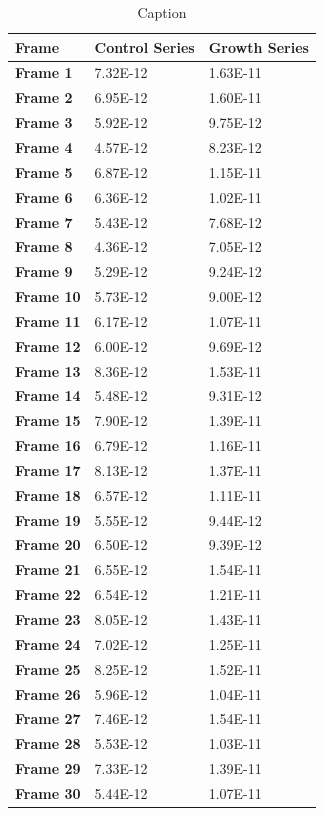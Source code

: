 \documentclass{article}
\begin{document}
\begin{table}[h!]
    \centering
    \begin{tabular}{ |p{3cm}||p{3cm}|p{3cm}|  }
     \hline Frame & Control Series & Growth Series\\
 \hline 
\textbf{Frame 1} & 7.32E-12 & 1.63E-11\\
\textbf{Frame 2} & 6.95E-12 & 1.60E-11\\
\textbf{Frame 3} & 5.92E-12 & 9.75E-12\\
\textbf{Frame 4} & 4.57E-12 & 8.23E-12\\
\textbf{Frame 5} & 6.87E-12 & 1.15E-11\\
\textbf{Frame 6} & 6.36E-12 & 1.02E-11\\
\textbf{Frame 7} & 5.43E-12 & 7.68E-12\\
\textbf{Frame 8} & 4.36E-12 & 7.05E-12\\
\textbf{Frame 9} & 5.29E-12 & 9.24E-12\\
\textbf{Frame 10} & 5.73E-12 & 9.00E-12\\
\textbf{Frame 11} & 6.17E-12 & 1.07E-11\\
\textbf{Frame 12} & 6.00E-12 & 9.69E-12\\
\textbf{Frame 13} & 8.36E-12 & 1.53E-11\\
\textbf{Frame 14} & 5.48E-12 & 9.31E-12\\
\textbf{Frame 15} & 7.90E-12 & 1.39E-11\\
\textbf{Frame 16} & 6.79E-12 & 1.16E-11\\
\textbf{Frame 17} & 8.13E-12 & 1.37E-11\\
\textbf{Frame 18} & 6.57E-12 & 1.11E-11\\
\textbf{Frame 19} & 5.55E-12 & 9.44E-12\\
\textbf{Frame 20} & 6.50E-12 & 9.39E-12\\
\textbf{Frame 21} & 6.55E-12 & 1.54E-11\\
\textbf{Frame 22} & 6.54E-12 & 1.21E-11\\
\textbf{Frame 23} & 8.05E-12 & 1.43E-11\\
\textbf{Frame 24} & 7.02E-12 & 1.25E-11\\
\textbf{Frame 25} & 8.25E-12 & 1.52E-11\\
\textbf{Frame 26} & 5.96E-12 & 1.04E-11\\
\textbf{Frame 27} & 7.46E-12 & 1.54E-11\\
\textbf{Frame 28} & 5.53E-12 & 1.03E-11\\
\textbf{Frame 29} & 7.33E-12 & 1.39E-11\\
\textbf{Frame 30} & 5.44E-12 & 1.07E-11\\
 \hline
    \end{tabular}
    \caption{Caption}
    \label{tab:my_label}
\end{table}
\end{document}
